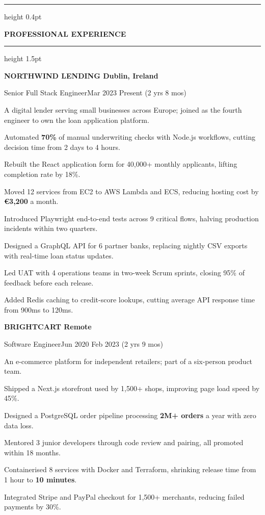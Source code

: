 \documentclass[a4paper,10pt]{article}
\newcommand{\bodyfont}{\fontsize{10.6}{13.1}\selectfont}
\newcommand{\Cap}[1]{{\fontsize{12}{13}\selectfont #1}}
\newcommand{\rsection}[1]{%
  \par\vspace{7pt}%
  {\color{textblack}\hrule height 0.4pt}%
  \vspace{3.5pt}%
  \centerline{\bfseries\fontsize{9.5}{13}\selectfont\MakeUppercase{#1}}%
  \vspace{2.5pt}%
  {\color{textblack}\hrule height 1.5pt}%
  \vspace{7pt}%
  \bodyfont
}
\newcommand{\job}[3]{%
  {\bfseries\fontsize{11}{13.2}\selectfont #1\par
   #2\hfill #3\par}%
  \vspace{4pt}\bodyfont
}
\begin{document}
\rsection{\Cap{P}rofessional \Cap{E}xperience}

\job{NORTHWIND LENDING \textendash{} Dublin, Ireland}{Senior Full Stack Engineer}{Mar 2023 \textendash{} Present (2 yrs 8 mos)}
A digital lender serving small businesses across Europe; joined as the fourth engineer to own the loan application platform.\par
\begin{rbullets}
  \item Automated \textbf{70\%} of manual underwriting checks with Node.js workflows, cutting decision time from 2 days to 4 hours.
  \item Rebuilt the React application form for 40,000+ monthly applicants, lifting completion rate by 18\%.
  \item Moved 12 services from EC2 to AWS Lambda and ECS, reducing hosting cost by \textbf{€3,200} a month.
  \item Introduced Playwright end-to-end tests across 9 critical flows, halving production incidents within two quarters.
  \item Designed a GraphQL API for 6 partner banks, replacing nightly CSV exports with real-time loan status updates.
  \item Led UAT with 4 operations teams in two-week Scrum sprints, closing 95\% of feedback before each release.
  \item Added Redis caching to credit-score lookups, cutting average API response time from 900ms to 120ms.
\end{rbullets}

\job{BRIGHTCART \textendash{} Remote}{Software Engineer}{Jun 2020 \textendash{} Feb 2023 (2 yrs 9 mos)}
An e-commerce platform for independent retailers; part of a six-person product team.\par
\begin{rbullets}
  \item Shipped a Next.js storefront used by 1,500+ shops, improving page load speed by 45\%.
  \item Designed a PostgreSQL order pipeline processing \textbf{2M+ orders} a year with zero data loss.
  \item Mentored 3 junior developers through code review and pairing, all promoted within 18 months.
  \item Containerised 8 services with Docker and Terraform, shrinking release time from 1 hour to \textbf{10 minutes}.
  \item Integrated Stripe and PayPal checkout for 1,500+ merchants, reducing failed payments by 30\%.
\end{rbullets}
\end{document}

